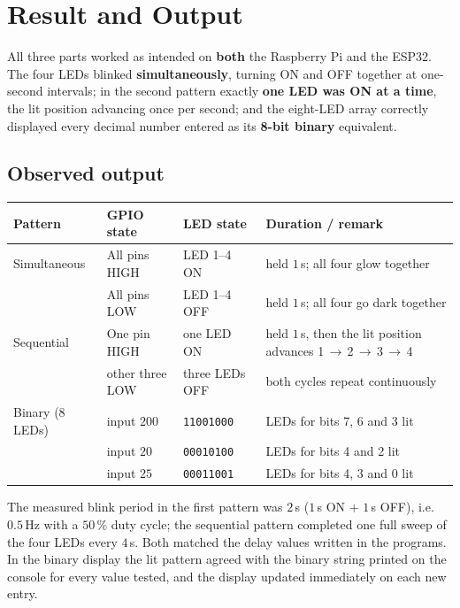 \documentclass[10pt,a4paper]{article}
\begin{document}
\section{Result and Output}

\begin{keybox}
All three parts worked as intended on \textbf{both} the Raspberry Pi and the ESP32.
The four LEDs blinked \textbf{simultaneously}, turning ON and OFF together at
one-second intervals; in the second pattern exactly \textbf{one LED was ON at a time},
the lit position advancing once per second; and the eight-LED array correctly
displayed every decimal number entered as its \textbf{8-bit binary} equivalent.
\end{keybox}

\subsection*{Observed output}

\vspace{2pt}
\noindent
\begin{tabularx}{\textwidth}{@{}l l l X@{}}
\toprule
\rowcolor{soft}
\textbf{Pattern} & \textbf{GPIO state} & \textbf{LED state} & \textbf{Duration / remark} \\
\midrule
Simultaneous & All pins HIGH & LED 1--4 ON  & held $1\,$s; all four glow together \\
             & All pins LOW  & LED 1--4 OFF & held $1\,$s; all four go dark together \\
\midrule
Sequential   & One pin HIGH  & one LED ON   & held $1\,$s, then the lit position
                                              advances 1\,$\to$\,2\,$\to$\,3\,$\to$\,4 \\
             & other three LOW & three LEDs OFF & both cycles repeat continuously \\
\midrule
Binary (8 LEDs) & input $200$ & \texttt{11001000} & LEDs for bits 7, 6 and 3 lit \\
                & input $20$  & \texttt{00010100} & LEDs for bits 4 and 2 lit \\
                & input $25$  & \texttt{00011001} & LEDs for bits 4, 3 and 0 lit \\
\bottomrule
\end{tabularx}

\vspace{8pt}
\noindent The measured blink period in the first pattern was $2\,$s ($1\,$s ON $+$
$1\,$s OFF), i.e.\ $0.5\,$Hz with a $50\,\%$ duty cycle; the sequential pattern
completed one full sweep of the four LEDs every $4\,$s. Both matched the delay values
written in the programs. In the binary display the lit pattern agreed with the binary
string printed on the console for every value tested, and the display updated
immediately on each new entry.
\end{document}
